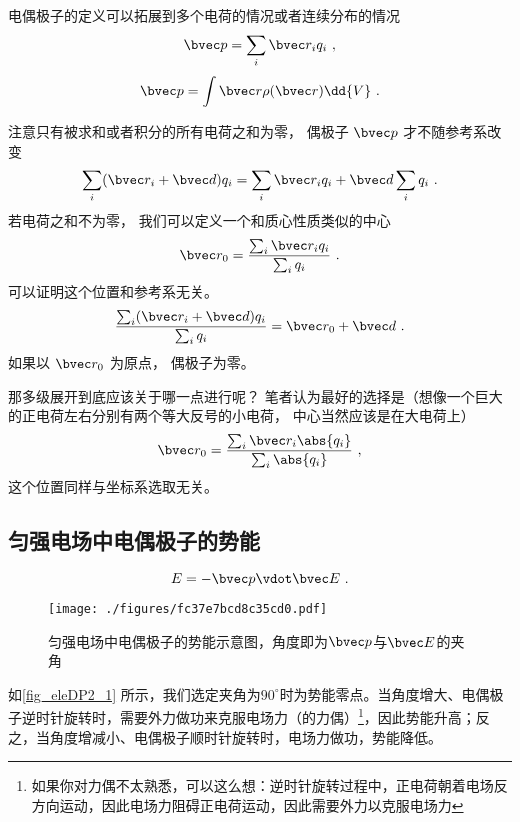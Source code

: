 

电偶极子的定义可以拓展到多个电荷的情况或者连续分布的情况
\begin{equation}
\bvec p = \sum_i \bvec r_i q_i~,
\end{equation}
\begin{equation}\label{eq_eleDP2_2}
\bvec p = \int \bvec r \rho(\bvec r) \dd{V}~.
\end{equation}

注意只有被求和或者积分的所有电荷之和为零， 偶极子 $\bvec p$ 才不随参考系改变
\begin{equation}
\sum_i (\bvec r_i + \bvec d) q_i = \sum_i \bvec r_i q_i + \bvec d \sum_i q_i~.
\end{equation}
若电荷之和不为零， 我们可以定义一个和质心性质类似的中心
\begin{equation}
\bvec r_0 = \frac{\sum_i \bvec r_i q_i}{\sum_i q_i}~.
\end{equation}
可以证明这个位置和参考系无关。
\begin{equation}
\frac{\sum_i (\bvec r_i + \bvec d) q_i}{\sum_i q_i} = \bvec r_0 + \bvec d~.
\end{equation}
如果以 $\bvec r_0$ 为原点， 偶极子为零。

那多级展开到底应该关于哪一点进行呢？ 笔者认为最好的选择是（想像一个巨大的正电荷左右分别有两个等大反号的小电荷， 中心当然应该是在大电荷上）
\begin{equation}
\bvec r_0 = \frac{\sum_i \bvec r_i \abs{q_i}}{\sum_i \abs{q_i}}~,
\end{equation}
这个位置同样与坐标系选取无关。

\subsection{匀强电场中电偶极子的势能}
\begin{equation}\label{eq_eleDP2_1}
E = -\bvec p \vdot \bvec E~.
\end{equation}
\begin{figure}[ht]
\centering
\texttt{[image: ./figures/fc37e7bcd8c35cd0.pdf]}
\caption{匀强电场中电偶极子的势能示意图，角度即为$\bvec p$与$\bvec E$的夹角} \label{fig_eleDP2_1}
\end{figure}
如\autoref{fig_eleDP2_1} 所示，我们选定夹角为$90^\circ$时为势能零点。当角度增大、电偶极子逆时针旋转时，需要外力做功来克服电场力（的力偶）\footnote{如果你对力偶不太熟悉，可以这么想：逆时针旋转过程中，正电荷朝着电场反方向运动，因此电场力阻碍正电荷运动，因此需要外力以克服电场力}，因此势能升高；反之，当角度增减小、电偶极子顺时针旋转时，电场力做功，势能降低。
